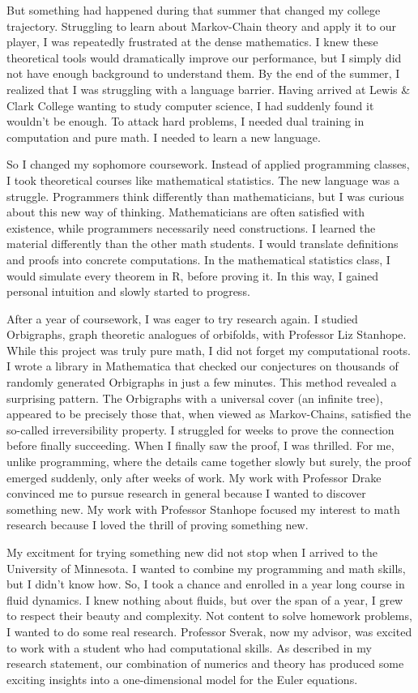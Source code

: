 \documentclass[12pt]{article}
\begin{document}
But something had happened during that summer that changed my college trajectory. Struggling to learn about Markov-Chain theory and apply it to our player, I was repeatedly frustrated at the dense mathematics. I knew these theoretical tools would dramatically improve our performance, but I simply did not have enough background to understand them. By the end of the summer, I realized that I was struggling with a language barrier. Having arrived at Lewis \& Clark College wanting to study computer science, I had suddenly found it wouldn't be enough. To attack hard problems, I needed dual training in computation and pure math. I needed to learn a new language.

So I changed my sophomore coursework. Instead of applied programming classes, I took  theoretical courses like mathematical statistics. The new language was a struggle. Programmers think differently than mathematicians, but I was curious about this new way of thinking. Mathematicians are often satisfied with existence, while programmers necessarily need constructions. I learned the material differently than the other math students. I would translate definitions and proofs into concrete computations. In the mathematical statistics class, I would simulate every theorem in R, before proving it. In this way, I gained personal intuition and slowly started to progress.

After a year of coursework, I was eager to try research again. I studied Orbigraphs, graph theoretic analogues of orbifolds, with Professor Liz Stanhope. While this project was truly pure math, I did not forget my computational roots. I wrote a library in Mathematica that checked our conjectures on thousands of randomly generated Orbigraphs in just a few minutes. This method revealed a surprising pattern. The Orbigraphs with a universal cover (an infinite tree), appeared to be precisely those that, when viewed as Markov-Chains, satisfied the so-called irreversibility property. I struggled for weeks to prove the connection before finally succeeding. When I finally saw the proof, I was thrilled. For me, unlike programming, where the details came together slowly but surely, the proof emerged suddenly, only after weeks of work. My work with Professor Drake convinced me to pursue research in general because I wanted to discover something new. My work with Professor Stanhope focused my interest to math research because I loved the thrill of proving something new.

My excitment for trying something new did not stop when I arrived to the University of Minnesota. I wanted to combine my programming and math skills, but I didn't know how. So, I took a chance and enrolled in a year long course in fluid dynamics. I knew nothing about fluids, but over the span of a year, I grew to respect their beauty and complexity. Not content to solve homework problems, I wanted to do some real research. Professor Sverak, now my advisor, was excited to work with a student who had computational skills. As described in my research statement, our combination of numerics and theory has produced some exciting insights into a one-dimensional model for the Euler equations.
\end{document}
